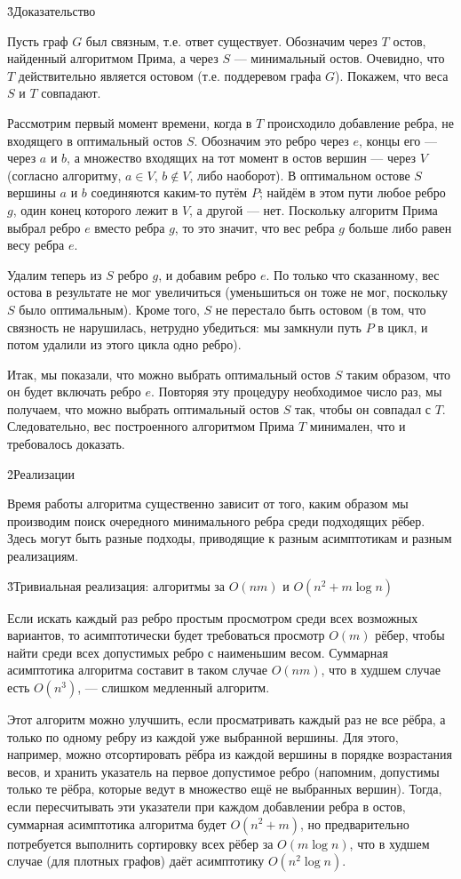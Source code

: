 \h3{Доказательство}

Пусть граф $G$ был связным, т.е. ответ существует. Обозначим через $T$ остов, найденный алгоритмом Прима, а через $S$ --- минимальный остов. Очевидно, что $T$ действительно является остовом (т.е. поддеревом графа $G$). Покажем, что веса $S$ и $T$ совпадают.

Рассмотрим первый момент времени, когда в $T$ происходило добавление ребра, не входящего в оптимальный остов $S$. Обозначим это ребро через $e$, концы его --- через $a$ и $b$, а множество входящих на тот момент в остов вершин --- через $V$ (согласно алгоритму, $a \in V$, $b \not\in V$, либо наоборот). В оптимальном остове $S$ вершины $a$ и $b$ соединяются каким-то путём $P$; найдём в этом пути любое ребро $g$, один конец которого лежит в $V$, а другой --- нет. Поскольку алгоритм Прима выбрал ребро $e$ вместо ребра $g$, то это значит, что вес ребра $g$ больше либо равен весу ребра $e$.

Удалим теперь из $S$ ребро $g$, и добавим ребро $e$. По только что сказанному, вес остова в результате не мог увеличиться (уменьшиться он тоже не мог, поскольку $S$ было оптимальным). Кроме того, $S$ не перестало быть остовом (в том, что связность не нарушилась, нетрудно убедиться: мы замкнули путь $P$ в цикл, и потом удалили из этого цикла одно ребро).

Итак, мы показали, что можно выбрать оптимальный остов $S$ таким образом, что он будет включать ребро $e$. Повторяя эту процедуру необходимое число раз, мы получаем, что можно выбрать оптимальный остов $S$ так, чтобы он совпадал с $T$. Следовательно, вес построенного алгоритмом Прима $T$ минимален, что и требовалось доказать.


\h2{Реализации}

Время работы алгоритма существенно зависит от того, каким образом мы производим поиск очередного минимального ребра среди подходящих рёбер. Здесь могут быть разные подходы, приводящие к разным асимптотикам и разным реализациям.


\h3{Тривиальная реализация: алгоритмы за $O(n m)$ и $O(n^2 + m \log n)$}

Если искать каждый раз ребро простым просмотром среди всех возможных вариантов, то асимптотически будет требоваться просмотр $O(m)$ рёбер, чтобы найти среди всех допустимых ребро с наименьшим весом. Суммарная асимптотика алгоритма составит в таком случае $O(nm)$, что в худшем случае есть $O(n^3)$, --- слишком медленный алгоритм.

Этот алгоритм можно улучшить, если просматривать каждый раз не все рёбра, а только по одному ребру из каждой уже выбранной вершины. Для этого, например, можно отсортировать рёбра из каждой вершины в порядке возрастания весов, и хранить указатель на первое допустимое ребро (напомним, допустимы только те рёбра, которые ведут в множество ещё не выбранных вершин). Тогда, если пересчитывать эти указатели при каждом добавлении ребра в остов, суммарная асимптотика алгоритма будет $O(n^2 + m)$, но предварительно потребуется выполнить сортировку всех рёбер за $O(m \log n)$, что в худшем случае (для плотных графов) даёт асимптотику $O(n^2 \log n)$.

